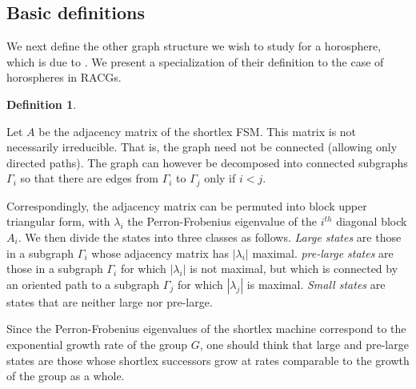 \documentclass[10pt,a4paper]{amsart}
\theoremstyle{definition}
\newtheorem{definition}[theorem]{Definition}
\theoremstyle{remark}
\begin{document}
	\subsection{Basic definitions}
	\label{subsec:DivergenceDefinitions}
	We next define the other graph structure we wish to study for a horosphere, which is due to \cite{CGSR}. We present a specialization of their definition to the case of horospheres in RACGs.
	
	\begin{definition} \label{DivergenceGraphDef}
		
		Let $A$ be the adjacency matrix of the shortlex FSM. This matrix is not necessarily irreducible. That is, the graph need not be connected (allowing only directed paths). The graph can however be decomposed into connected subgraphs $\Gamma_i$ so that there are edges from $\Gamma_i$ to $\Gamma_j$ only if $i<j$. 
		
		Correspondingly, the adjacency matrix can be permuted into block upper triangular form, with $\lambda_i$ the Perron-Frobenius eigenvalue of the $i^{th}$ diagonal block $A_i$. We then divide the states into three classes as follows. \textit{Large states} are those in a subgraph $\Gamma_i$ whose adjacency matrix has $|\lambda_i|$ maximal. \textit{pre-large states} are those in a subgraph $\Gamma_i$ for which $|\lambda_i|$ is not maximal, but which is connected by an oriented path to a subgraph $\Gamma_j$ for which $|\lambda_j|$ is maximal. \textit{Small states} are states that are neither large nor pre-large.
		
	\end{definition}
	
	Since the Perron-Frobenius eigenvalues of the shortlex machine correspond to the exponential growth rate of the group $G$, one should think that large and pre-large states are those whose shortlex successors grow at rates comparable to the growth of the group as a whole.
	
\end{document}

